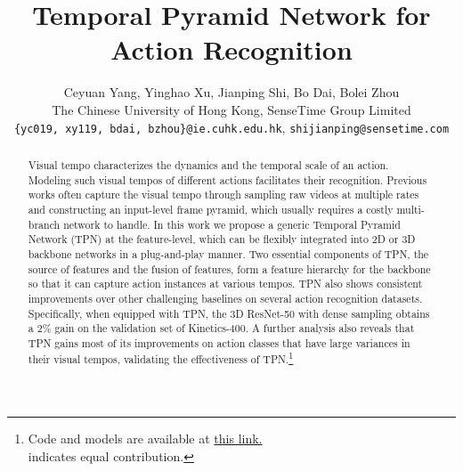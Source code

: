 \documentclass[10pt,twocolumn,letterpaper]{article}
\begin{document}
\title{Temporal Pyramid Network for Action Recognition}

\author{
  Ceyuan Yang, Yinghao Xu, Jianping Shi, Bo Dai, Bolei Zhou\\
  The Chinese University of Hong Kong, SenseTime Group Limited\\
  {\tt\small \{yc019, xy119, bdai, bzhou\}@ie.cuhk.edu.hk},
  {\tt\small shijianping@sensetime.com}\\
}

\maketitle


\begin{abstract}
   Visual tempo characterizes the dynamics and the temporal scale of an action. Modeling such visual tempos of different actions facilitates their recognition.
Previous works often capture the visual tempo through sampling raw videos at multiple rates and constructing an input-level frame pyramid, which usually requires a costly multi-branch network to handle. 
In this work we propose a generic Temporal Pyramid Network (TPN) at the feature-level, 
which can be flexibly integrated into 2D or 3D backbone networks in a plug-and-play manner. Two essential components of TPN, the source of features and the fusion of features, form a feature hierarchy for the backbone so that it can capture action instances at various tempos. TPN also shows consistent improvements over other challenging baselines on several action recognition datasets.
Specifically, when equipped with TPN, the 3D ResNet-50 with dense sampling obtains a
2\% gain on the validation set of Kinetics-400.
A further analysis also reveals that TPN gains most of its improvements on action classes that have large variances in their visual tempos, validating the effectiveness of TPN.\footnote{Code and models are available at \href{https://decisionforce.github.io/TPN/}{this link.} \\ \indent  indicates equal contribution.}
 \end{abstract}
\end{document}
